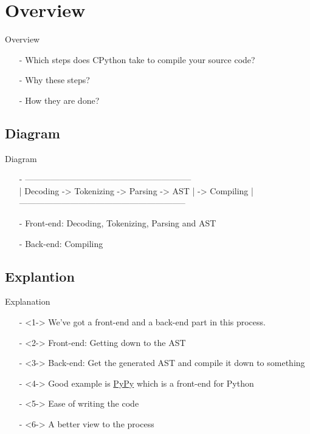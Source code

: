 \section{Overview}
\begin{frame}{Overview}
\begin{itemize}
\item[-]
Which steps does CPython take to compile your source code?
\item[-]
Why these steps?
\item[-]
How they are done?
\end{itemize}
\end{frame}

\subsection{Diagram}
\begin{frame}{Diagram}
\begin{itemize}
\item[-] 
{\small \ttfamily 
----------------------------------------------------------- \\
| Decoding -> Tokenizing -> Parsing -> AST | -> Compiling | \\
----------------------------------------------------------- \\
}

\item[-]
Front-end: Decoding, Tokenizing, Parsing and AST

\item[-]
Back-end: Compiling
\end{itemize}
\end{frame}

\subsection{Explantion}
\begin{frame}{Explanation}
\begin{itemize}
\item[-]<1->
We’ve got a front-end and a back-end part in this process.

\item[-]<2->
Front-end: Getting down to the AST

\item[-]<3->
Back-end: Get the generated AST and compile it down to something

\item[-]<4->
Good example is \href{https://www.pypy.org/}{PyPy} which is a front-end for Python

\item[-]<5->
Ease of writing the code

\item[-]<6->
A better view to the process
\end{itemize}
\end{frame}
